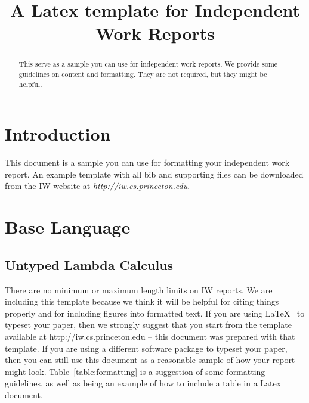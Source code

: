 \message{ !name(template.tex)}\documentclass[pageno]{jpaper}
\begin{document}


\title{
A Latex template for Independent Work Reports}

\date{}
\maketitle

\thispagestyle{empty}

\begin{abstract}
This    serve as a sample you can use for independent work reports.  We provide some guidelines on content and formatting.  They are not required, but they might be helpful.
\end{abstract}

\section{Introduction}

This document is a sample you can use for formatting your independent work
report.  An example template with all bib and supporting files can be downloaded
from the IW website at {\em http://iw.cs.princeton.edu}.

\section{Base Language}

\subsection{Untyped Lambda Calculus}

There are no minimum or maximum length limits on IW reports.  
We are including this template because we think it will be helpful
for citing things properly and for including figures into formatted
text.  If you are using \LaTeX~\cite{lamport94} 
to typeset your paper, then we strongly suggest
that you start from the template available at
http://iw.cs.princeton.edu -- this
document was prepared with that template.  
If you are using a different software package to typeset your paper, 
then you can still use this document as a reasonable sample of 
how your report might look.  Table~\ref{table:formatting} is a suggestion
of some formatting guidelines, as well as being an example of how to
include a table in a Latex document.


\end{document}
